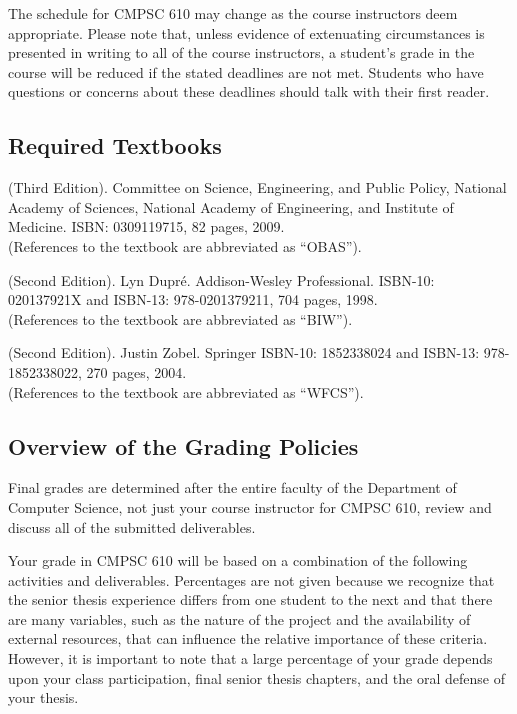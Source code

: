 \noindent The schedule for CMPSC 610 may change as the course instructors deem appropriate. Please note that, unless
evidence of extenuating circumstances is presented in writing to all of the course instructors, a student's grade in the
course will be reduced if the stated deadlines are not met. Students who have questions or concerns about these
deadlines should talk with their first reader.

\vspace{-.15in}
\subsection*{Required Textbooks}
\vspace{-.05in}

 (Third Edition).  Committee on Science,
Engineering, and Public Policy, National Academy of Sciences, National Academy of Engineering, and Institute of
Medicine. ISBN: 0309119715, 82 pages, 2009.\\ (References to the textbook are abbreviated as ``OBAS'').

 (Second Edition). Lyn Dupr\'e.  Addison-Wesley
Professional.  ISBN-10: 020137921X and ISBN-13: 978-0201379211, 704 pages, 1998.\\ (References to the textbook are
abbreviated as ``BIW'').

 (Second Edition).  Justin Zobel.  Springer ISBN-10: 1852338024 and ISBN-13:
978-1852338022, 270 pages, 2004. \\ (References to the textbook are abbreviated as ``WFCS'').

\vspace*{-.15in}
\subsection*{Overview of the Grading Policies}

Final grades are determined after the entire faculty of the Department of Computer Science, not just your course
instructor for CMPSC 610, review and discuss all of the submitted deliverables.

Your grade in CMPSC 610 will be based on a combination of the following activities and deliverables. Percentages are not
given because we recognize that the senior thesis experience differs from one student to the next and that there are many
variables, such as the nature of the project and the availability of external resources, that can influence the relative
importance of these criteria. However, it is important to note that a large percentage of your grade depends upon your
class participation, final senior thesis chapters, and the oral defense of your thesis.

